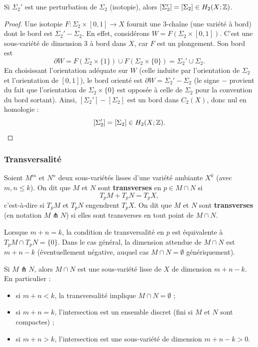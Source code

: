 \begin{lemma}
Si $\Sigma_2'$ est une perturbation de $\Sigma_2$ (isotopie), alors $[\Sigma_2'] = [\Sigma_2] \in H_2(X;\mathbb{Z})$.
\end{lemma}
\begin{proof}
Une isotopie $F : \Sigma_2 \times [0,1] \to X$ fournit une 3-chaîne (une variété à bord) dont le bord est $\Sigma_2' - \Sigma_2$. En effet, considérons $W = F(\Sigma_2 \times [0,1])$. C'est une sous-variété de dimension $3$ à bord dans $X$, car $F$ est un plongement. Son bord est
\[
\partial W = F(\Sigma_2 \times \{1\}) \cup F(\Sigma_2 \times \{0\}) = \Sigma_2' \cup \Sigma_2.
\]
En choisissant l'orientation adéquate sur $W$ (celle induite par l'orientation de $\Sigma_2$ et l'orientation de $[0,1]$), le bord orienté est $\partial W = \Sigma_2' - \Sigma_2$ (le signe $-$ provient du fait que l'orientation de $\Sigma_2 \times \{0\}$ est opposée à celle de $\Sigma_2$ pour la convention du bord sortant). Ainsi, $[\Sigma_2'] - [\Sigma_2]$ est un bord dans $C_2(X)$, donc nul en homologie :
\[
[\Sigma_2'] = [\Sigma_2] \in H_2(X;\mathbb{Z}).
\]
\end{proof}



\subsubsection{Transversalité}

\begin{definition}
Soient $M^m$ et $N^n$ deux sous-variétés lisses d'une variété ambiante $X^k$ (avec $m, n \leq k$). On dit que $M$ et $N$ sont \textbf{transverses} en $p \in M \cap N$ si
\[
  T_p M + T_p N = T_p X,
\]
c'est-à-dire si $T_p M$ et $T_p N$ engendrent $T_p X$. On dit que $M$ et $N$ sont \textbf{transverses} (en notation $M \pitchfork N$) si elles sont transverses en tout point de $M \cap N$.

Lorsque $m + n = k$, la condition de transversalité en $p$ est équivalente à $T_p M \cap T_p N = \{0\}$. Dans le cas général, la dimension attendue de $M \cap N$ est $m + n - k$ (éventuellement négative, auquel cas $M \cap N = \emptyset$ génériquement).
\end{definition}

\begin{remark}
Si $M \pitchfork N$, alors $M \cap N$ est une sous-variété lisse de $X$ de dimension $m + n - k$. En particulier :
\begin{itemize}
  \item si $m + n < k$, la transversalité implique $M \cap N = \emptyset$ ;
  \item si $m + n = k$, l'intersection est un ensemble discret (fini si $M$ et $N$ sont compactes) ;
  \item si $m + n > k$, l'intersection est une sous-variété de dimension $m + n - k > 0$.
\end{itemize}
\end{remark}

